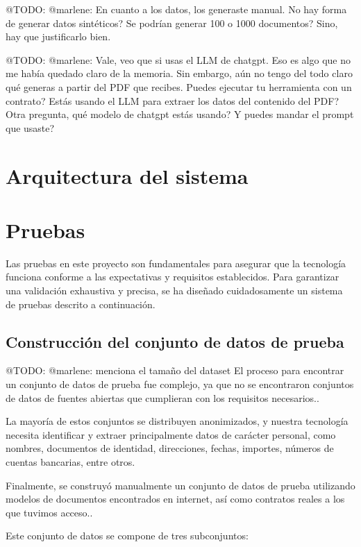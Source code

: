 \colorbox{color_highlight}{@TODO: @marlene:}
En cuanto a los datos, los generaste manual. No hay forma de generar datos sintéticos? Se podrían generar 100 o 1000
documentos? Sino, hay que justificarlo bien.

\colorbox{color_highlight}{@TODO: @marlene:}
Vale, veo que si usas el LLM de chatgpt. Eso es algo que no me había quedado claro de la memoria. Sin embargo, aún no
tengo del todo claro qué generas a partir del PDF que recibes. Puedes ejecutar tu herramienta con un contrato? Estás
usando el LLM para extraer los datos del contenido del PDF? Otra pregunta, qué modelo de chatgpt estás usando? Y puedes
mandar el prompt que usaste?


\section{Arquitectura del sistema}

\section*{Pruebas}
Las pruebas en este proyecto son fundamentales para asegurar que la tecnología funciona conforme a las expectativas y
requisitos establecidos. Para garantizar una validación exhaustiva y precisa, se ha diseñado cuidadosamente un sistema
de pruebas descrito a continuación.

\subsection*{Construcción del conjunto de datos de prueba}

\colorbox{color_highlight}{@TODO: @marlene:} menciona el tamaño del dataset
El proceso para encontrar un conjunto de datos de prueba fue complejo, ya que no se encontraron conjuntos de datos de
fuentes abiertas que cumplieran con los requisitos necesarios..

La mayoría de estos conjuntos se distribuyen anonimizados, y nuestra tecnología necesita identificar y extraer
principalmente datos de carácter personal, como nombres, documentos de identidad, direcciones, fechas, importes, números
de cuentas bancarias, entre otros.

Finalmente, se construyó manualmente un conjunto de datos de prueba utilizando modelos de documentos encontrados en
internet, así como contratos reales a los que tuvimos acceso..

Este conjunto de datos se compone de tres subconjuntos:


